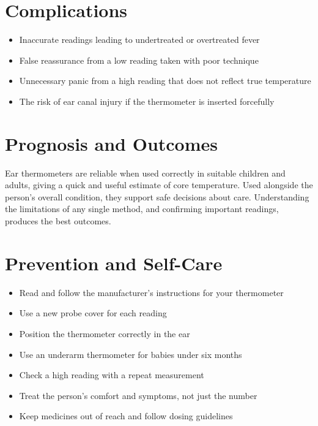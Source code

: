\section*{Complications}
\begin{itemize}
    \item Inaccurate readings leading to undertreated or overtreated fever
    \item False reassurance from a low reading taken with poor technique
    \item Unnecessary panic from a high reading that does not reflect true temperature
    \item The risk of ear canal injury if the thermometer is inserted forcefully
\end{itemize}

\section*{Prognosis and Outcomes}
Ear thermometers are reliable when used correctly in suitable children and adults, giving a quick and useful estimate of core temperature. Used alongside the person's overall condition, they support safe decisions about care. Understanding the limitations of any single method, and confirming important readings, produces the best outcomes.

\section*{Prevention and Self-Care}
\begin{itemize}
    \item Read and follow the manufacturer's instructions for your thermometer
    \item Use a new probe cover for each reading
    \item Position the thermometer correctly in the ear
    \item Use an underarm thermometer for babies under six months
    \item Check a high reading with a repeat measurement
    \item Treat the person's comfort and symptoms, not just the number
    \item Keep medicines out of reach and follow dosing guidelines
\end{itemize}

